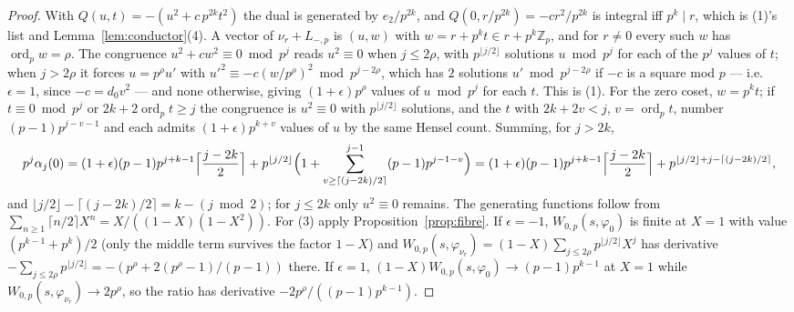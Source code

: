 \documentclass[11pt,reqno]{amsart}
\theoremstyle{plain}
\theoremstyle{definition}
\DeclareMathOperator{\ord}{ord}
\newcommand{\Z}{\mathbb{Z}}
\begin{document}
\begin{proof}
With $Q(u,t)=-(u^2+c\,p^{2k}t^2)$ the dual is generated by $e_2/p^{2k}$, and $Q(0,r/p^{2k})=
-cr^2/p^{2k}$ is integral iff $p^k\mid r$, which is (1)'s list and Lemma~\ref{lem:conductor}(4).
A vector of $\nu_r+L_{-,p}$ is $(u,w)$ with $w=r+p^kt\in r+p^k\Z_p$, and for $r\ne0$ every such $w$
has $\ord_pw=\rho$. The congruence $u^2+cw^2\equiv0\bmod p^j$ reads $u^2\equiv0$ when $j\le2\rho$,
with $p^{\lfloor j/2\rfloor}$ solutions $u\bmod p^j$ for each of the $p^j$ values of $t$; when
$j>2\rho$ it forces $u=p^\rho u'$ with $u'^2\equiv-c(w/p^\rho)^2\bmod p^{j-2\rho}$, which has $2$
solutions $u'\bmod p^{j-2\rho}$ if $-c$ is a square mod $p$ --- i.e.\ $\epsilon=1$, since
$-c=d_0v^2$ --- and none otherwise, giving $(1+\epsilon)p^{\rho}$ values of $u\bmod p^j$ for each
$t$. This is (1). For the zero coset, $w=p^kt$; if $t\equiv0\bmod p^j$ or $2k+2\ord_pt\ge j$ the
congruence is $u^2\equiv0$ with $p^{\lfloor j/2\rfloor}$ solutions, and the $t$ with
$2k+2v<j$, $v=\ord_pt$, number $(p-1)p^{j-v-1}$ and each admits $(1+\epsilon)p^{k+v}$ values of
$u$ by the same Hensel count. Summing, for $j>2k$,
\[
  p^j\alpha_j(0)=(1+\epsilon)(p-1)p^{j+k-1}\Bigl\lceil\frac{j-2k}2\Bigr\rceil
   +p^{\lfloor j/2\rfloor}\Bigl(1+\sum_{v\ge\lceil(j-2k)/2\rceil}^{j-1}(p-1)p^{j-1-v}\Bigr)
   =(1+\epsilon)(p-1)p^{j+k-1}\Bigl\lceil\frac{j-2k}2\Bigr\rceil+p^{\lfloor j/2\rfloor+j-\lceil(j-2k)/2\rceil},
\]
and $\lfloor j/2\rfloor-\lceil (j-2k)/2\rceil=k-(j\bmod2)$; for $j\le2k$ only $u^2\equiv0$ remains.
The generating functions follow from $\sum_{n\ge1}\lceil n/2\rceil X^n=X/((1-X)(1-X^2))$. For (3)
apply Proposition~\ref{prop:fibre}. If $\epsilon=-1$, $W_{0,p}(s,\varphi_0)$ is finite at $X=1$ with
value $(p^{k-1}+p^k)/2$ (only the middle term survives the factor $1-X$) and $W_{0,p}(s,
\varphi_{\nu_r})=(1-X)\sum_{j\le2\rho}p^{\lfloor j/2\rfloor}X^j$ has derivative
$-\sum_{j\le2\rho}p^{\lfloor j/2\rfloor}=-(p^\rho+2(p^\rho-1)/(p-1))$ there. If $\epsilon=1$,
$(1-X)W_{0,p}(s,\varphi_0)\to(p-1)p^{k-1}$ at $X=1$ while $W_{0,p}(s,\varphi_{\nu_r})\to2p^\rho$,
so the ratio has derivative $-2p^\rho/((p-1)p^{k-1})$.


\end{proof}
\end{document}
